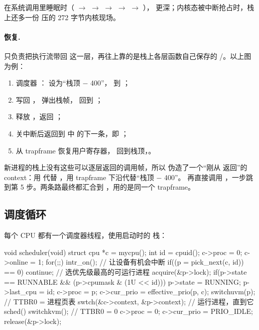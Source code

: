 在系统调用里睡眠时（ $\to$  $\to$  $\to$  $\to$  $\to$ ）， 更深；内核态被中断抢占时，栈上还多一份  压的 272 字节内核现场。

\paragraph{恢复.}  只负责把执行流带回  这一层，再往上靠的是栈上各层函数自己保存的 /。以上图为例：

\begin{enumerate}
  \item 调度器 ： 设为“栈顶 $-$ 400”， 到 ；
  \item {} 写回 ， 弹出栈帧， 回到 ；
  \item {} 释放 ，返回 ；
  \item {} 关中断后返回到  中  的下一条，即 ；
  \item {} 从 trapframe 恢复用户寄存器， 回到栈顶，。
\end{enumerate}

新进程的栈上没有这些可以逐层返回的调用帧，所以  伪造了一个“刚从  返回”的 context：用  代替 ，用 trapframe 下沿代替“栈顶 $-$ 400”。 再直接调用 ，一步跳到第 5 步。两条路最终都汇合到 ，用的是同一个 trapframe。

\subsection{调度循环}

每个 CPU 都有一个调度器线程，使用启动时的  栈：

\begin{ccode}
void scheduler(void) {
  struct cpu *c = mycpu();
  int id = cpuid();
  c->proc = 0;  c->online = 1;
  for(;;){
    intr_on();                                  // 让设备有机会中断
    if((p = pick_next(c, id)) == 0) continue;   // 选优先级最高的可运行进程
    acquire(&p->lock);
    if(p->state == RUNNABLE && (p->cpumask & (1U << id))){
      p->state = RUNNING;  p->last_cpu = id;
      c->proc = p;  c->cur_prio = effective_prio(p, c);
      switchuvm(p);                             // TTBR0 = 进程页表
      swtch(&c->context, &p->context);          // 运行进程，直到它 sched()
      switchkvm();                              // TTBR0 = 0
      c->proc = 0;  c->cur_prio = PRIO_IDLE;
    }
    release(&p->lock);
  }
}
\end{ccode}

